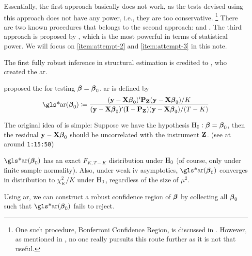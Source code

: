 \documentclass[a4paper]{article}
\begin{document}
Essentially, the first approach basically does not work,
as the tests devised using this approach does not have any power, i.e., they are too conservative.%
\footnote{
	One such procedure, Bonferroni Confidence Region, is discussed in \textcite{staiger-stock-1997}.
	However, as mentioned in \textcite{stock-2008}, no one really pursuits this route further as it is not that useful.
}
There are two known procedures that belongs to the second approach:  and .
The third approach is proposed by \textcite{moreira-2002},
which is the most powerful in terms of statistical power.
We will focus on \ref{item:attempt-2} and \ref{item:attempt-3} in this note.

The first fully robust inference in structural estimation is credited to \textcite{anderson-rubin-1949},
who created the \gls*{ar}.

\begin{definition}[\glsentrylong{ar}]\label{dfn:ar-1}
	\textcite{anderson-rubin-1949} proposed the  for testing $\boldsymbol{\beta}=\boldsymbol{\beta}_0$.
	\gls*{ar} is defined by
	\begin{align*}
		\text{\gls*{ar}}(\bbeta_0)
		\coloneqq
		\frac
		{ (\yy - \XX\bbeta_0)\T\PP_{\ZZ}(\yy - \XX\bbeta_0) / K }
		{ (\yy - \XX\bbeta_0)\T (\II-\PP_{\ZZ}) (\yy - \XX\bbeta_0) / (T - K) }
	\end{align*}
\end{definition}

\begin{remark}
	The original idea of \textcite{anderson-rubin-1949} is simple:
	Suppose we have the hypothesis $\mathrm{H}_0:\boldsymbol{\beta}=\boldsymbol{\beta}_0$,
	then the residual $\mathbf{y}-\mathbf{X}\boldsymbol{\beta}_0$ should be uncorrelated with the instrument $\mathbf{Z}$.
	(see \textcite{stock-2008} at around \texttt{1:15:50})
\end{remark}

\begin{remark}
	$\text{\gls*{ar}}(\bbeta_0)$ has an exact $F_{K,T-K}$ distribution under $\mathrm{H}_0$ (of course, only under finite sample normality).
	Also, under weak \gls*{iv} asymptotics,
	$\text{\gls*{ar}}(\bbeta_0)$ converges in distribution to $\chi_{K}^2/K$ under $\mathrm{H}_0$,
	regardless of the size of $\mu^2$.
	\parencite{stock-wright-yogo-2002}
\end{remark}

\begin{remark}
	Using \gls*{ar},
	we can construct a robust confidence region of $\boldsymbol{\beta}$
	by collecting all $\boldsymbol{\beta}_0$ such that $\text{\gls*{ar}}(\bbeta_0)$ fails to reject.
	\parencite{staiger-stock-1997}
\end{remark}
\end{document}
